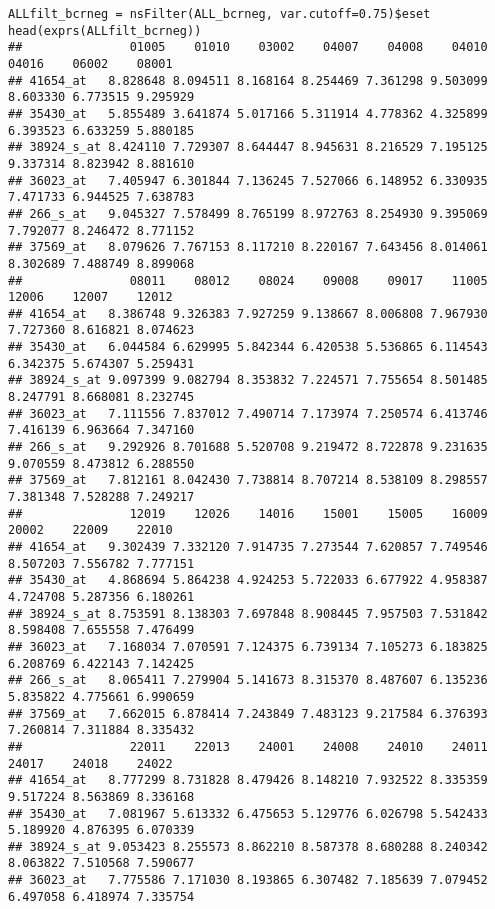 \begin{verbatim}
ALLfilt_bcrneg = nsFilter(ALL_bcrneg, var.cutoff=0.75)$eset
head(exprs(ALLfilt_bcrneg))
##               01005    01010    03002    04007    04008    04010    04016    06002    08001
## 41654_at   8.828648 8.094511 8.168164 8.254469 7.361298 9.503099 8.603330 6.773515 9.295929
## 35430_at   5.855489 3.641874 5.017166 5.311914 4.778362 4.325899 6.393523 6.633259 5.880185
## 38924_s_at 8.424110 7.729307 8.644447 8.945631 8.216529 7.195125 9.337314 8.823942 8.881610
## 36023_at   7.405947 6.301844 7.136245 7.527066 6.148952 6.330935 7.471733 6.944525 7.638783
## 266_s_at   9.045327 7.578499 8.765199 8.972763 8.254930 9.395069 7.792077 8.246472 8.771152
## 37569_at   8.079626 7.767153 8.117210 8.220167 7.643456 8.014061 8.302689 7.488749 8.899068
##               08011    08012    08024    09008    09017    11005    12006    12007    12012
## 41654_at   8.386748 9.326383 7.927259 9.138667 8.006808 7.967930 7.727360 8.616821 8.074623
## 35430_at   6.044584 6.629995 5.842344 6.420538 5.536865 6.114543 6.342375 5.674307 5.259431
## 38924_s_at 9.097399 9.082794 8.353832 7.224571 7.755654 8.501485 8.247791 8.668081 8.232745
## 36023_at   7.111556 7.837012 7.490714 7.173974 7.250574 6.413746 7.416139 6.963664 7.347160
## 266_s_at   9.292926 8.701688 5.520708 9.219472 8.722878 9.231635 9.070559 8.473812 6.288550
## 37569_at   7.812161 8.042430 7.738814 8.707214 8.538109 8.298557 7.381348 7.528288 7.249217
##               12019    12026    14016    15001    15005    16009    20002    22009    22010
## 41654_at   9.302439 7.332120 7.914735 7.273544 7.620857 7.749546 8.507203 7.556782 7.777151
## 35430_at   4.868694 5.864238 4.924253 5.722033 6.677922 4.958387 4.724708 5.287356 6.180261
## 38924_s_at 8.753591 8.138303 7.697848 8.908445 7.957503 7.531842 8.598408 7.655558 7.476499
## 36023_at   7.168034 7.070591 7.124375 6.739134 7.105273 6.183825 6.208769 6.422143 7.142425
## 266_s_at   8.065411 7.279904 5.141673 8.315370 8.487607 6.135236 5.835822 4.775661 6.990659
## 37569_at   7.662015 6.878414 7.243849 7.483123 9.217584 6.376393 7.260814 7.311884 8.335432
##               22011    22013    24001    24008    24010    24011    24017    24018    24022
## 41654_at   8.777299 8.731828 8.479426 8.148210 7.932522 8.335359 9.517224 8.563869 8.336168
## 35430_at   7.081967 5.613332 6.475653 5.129776 6.026798 5.542433 5.189920 4.876395 6.070339
## 38924_s_at 9.053423 8.255573 8.862210 8.587378 8.680288 8.240342 8.063822 7.510568 7.590677
## 36023_at   7.775586 7.171030 8.193865 6.307482 7.185639 7.079452 6.497058 6.418974 7.335754

\end{verbatim}
